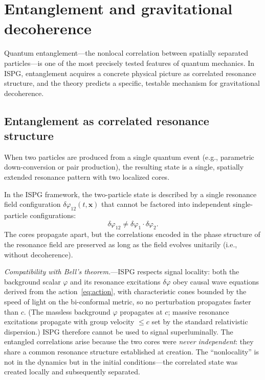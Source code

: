 \documentclass[aps,prd,onecolumn,superscriptaddress,nofootinbib,showpacs,12pt,notitlepage]{revtex4-2}
\begin{document}
\section{Entanglement and gravitational decoherence}
\label{sec:entanglement}

Quantum entanglement---the nonlocal correlation between
spatially separated particles---is one of the most precisely
tested features of quantum mechanics.  In ISPG, entanglement
acquires a concrete physical picture as correlated resonance
structure, and the theory predicts a specific, testable
mechanism for gravitational decoherence.

\subsection{Entanglement as correlated resonance structure}
\label{sec:entangle_interp}

When two particles are produced from a single quantum event
(e.g., parametric down-conversion or pair production), the
resulting state is a single, spatially extended resonance
pattern with two localized cores.

In the ISPG framework, the two-particle state is described by
a single resonance field configuration
$\delta\varphi_{12}(t,\mathbf{x})$ that cannot be factored
into independent single-particle configurations:
\begin{equation}\label{eq:entangled_state}
  \delta\varphi_{12} \neq \delta\varphi_1 \cdot \delta\varphi_2.
\end{equation}
The cores propagate apart, but the correlations encoded in
the phase structure of the resonance field are preserved as
long as the field evolves unitarily
(i.e., without decoherence).

\textit{Compatibility with Bell's theorem.}---ISPG
respects signal locality: both the background scalar
$\varphi$ and its resonance excitations $\delta\varphi$
obey causal wave equations derived from the
action~\eqref{eq:action}, with characteristic cones
bounded by the speed of light on the
bi-conformal metric, so no perturbation propagates
faster than $c$.  (The massless background $\varphi$
propagates at $c$; massive resonance excitations
propagate with group velocity $\leq c$ set by the
standard relativistic dispersion.)  ISPG therefore
cannot be used to signal superluminally.  The
entangled correlations arise because the two cores were
\emph{never independent}: they share a common resonance
structure established at creation.  The ``nonlocality''
is not in the dynamics but in the initial
conditions---the correlated state was created locally
and subsequently separated.
\end{document}
